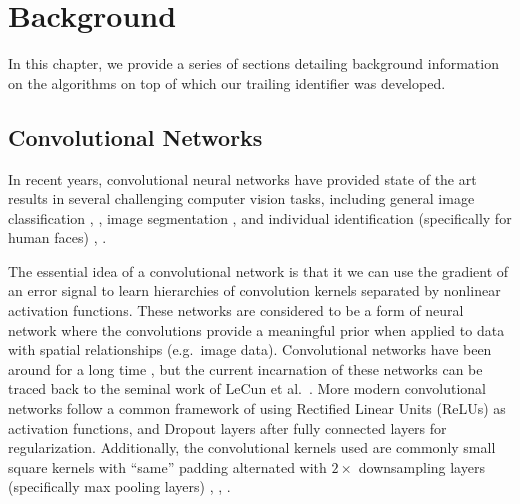  
\chapter{Background} \label{sec:background}

In this chapter, we provide a series of sections detailing background information on the algorithms on top of which our trailing identifier was developed.

\section{Convolutional Networks}

In recent years, convolutional neural networks have provided state of the art results in several challenging computer vision tasks, including general image classification \cite{krizhevsky2012imagenet}, \cite{szegedy2015going}, image segmentation \cite{long2015fully}, \cite{chen2014semantic} and individual identification (specifically for human faces) \cite{fan2014learning}, \cite{schroff2015facenet}.

The essential idea of a convolutional network is that it we can use the gradient of an error signal to learn hierarchies of convolution kernels separated by nonlinear activation functions.
These networks are considered to be a form of neural network where the convolutions provide a meaningful prior when applied to data with spatial relationships (e.g.\ image data).
Convolutional networks have been around for a long time \cite{fukushima1979neural}, but the current incarnation of these networks can be traced back to the seminal work of LeCun et al.\ \cite{lecun1998gradient}.
More modern convolutional networks follow a common framework of using Rectified Linear Units (ReLUs) as activation functions, and Dropout \cite{hinton2012improving} layers after fully connected layers for regularization. 
Additionally, the convolutional kernels used are commonly small square kernels with ``same'' padding alternated with $2\times$ downsampling layers (specifically max pooling layers) \cite{simonyan2014very}, \cite{sermanet2013overfeat}, \cite{krizhevsky2012imagenet}. %

